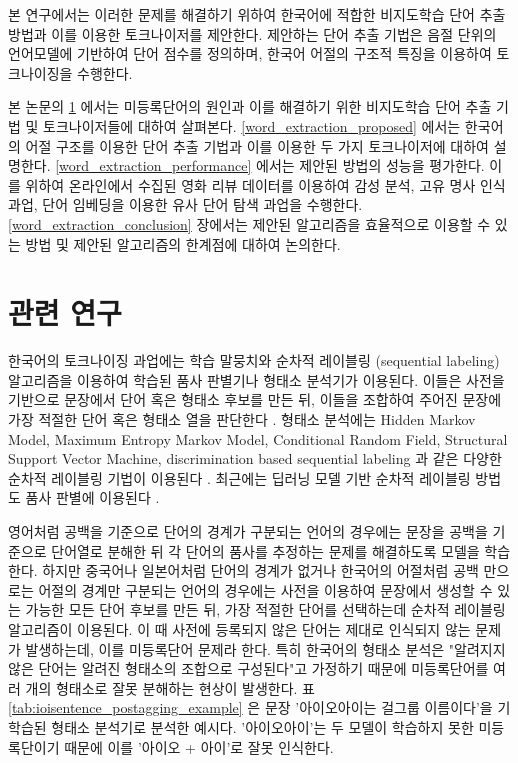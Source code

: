 \documentclass[oneside, ko,phd]{snuthesis_utf8_kor}
\begin{document}
본 연구에서는 이러한 문제를 해결하기 위하여 한국어에 적합한 비지도학습 단어 추출 방법과 이를 이용한 토크나이저를 제안한다.
제안하는 단어 추출 기법은 음절 단위의 언어모델에 기반하여 단어 점수를 정의하며, 한국어 어절의 구조적 특징을 이용하여 토크나이징을 수행한다.

본 논문의 \ref{word_extraction_related} 에서는 미등록단어의 원인과 이를 해결하기 위한 비지도학습 단어 추출 기법 및 토크나이저들에 대하여 살펴본다.
\ref{word_extraction_proposed} 에서는 한국어의 어절 구조를 이용한 단어 추출 기법과 이를 이용한 두 가지 토크나이저에 대하여 설명한다.
\ref{word_extraction_performance} 에서는 제안된 방법의 성능을 평가한다.
이를 위하여 온라인에서 수집된 영화 리뷰 데이터를 이용하여 감성 분석, 고유 명사 인식 과업, 단어 임베딩을 이용한 유사 단어 탐색 과업을 수행한다.
\ref{word_extraction_conclusion} 장에서는 제안된 알고리즘을 효율적으로 이용할 수 있는 방법 및 제안된 알고리즘의 한계점에 대하여 논의한다.

\section{관련 연구} \label{word_extraction_related}

한국어의 토크나이징 과업에는 학습 말뭉치와 순차적 레이블링 (sequential labeling) 알고리즘을 이용하여 학습된 품사 판별기나 형태소 분석기가 이용된다. \cite{konlpy,shim2007made}
이들은 사전을 기반으로 문장에서 단어 혹은 형태소 후보를 만든 뒤, 이들을 조합하여 주어진 문장에 가장 적절한 단어 혹은 형태소 열을 판단한다 \cite{brants2000tnt}.
형태소 분석에는 Hidden Markov Model, Maximum Entropy Markov Model, Conditional Random Field, Structural Support Vector Machine, discrimination based sequential labeling 과 같은 다양한 순차적 레이블링 기법이 이용된다 \cite{krogh1994hidden, mccallum2000maximum, kudo2004applying, taskar2004max, tsochantaridis2005large, bohnet2012transition, na2012crfs}.
최근에는 딥러닝 모델 기반 순차적 레이블링 방법도 품사 판별에 이용된다 \cite{zheng2013deep, collobert2011natural}.

영어처럼 공백을 기준으로 단어의 경계가 구분되는 언어의 경우에는 문장을 공백을 기준으로 단어열로 분해한 뒤 각 단어의 품사를 추정하는 문제를 해결하도록 모델을 학습한다.
하지만 중국어나 일본어처럼 단어의 경계가 없거나 한국어의 어절처럼 공백 만으로는 어절의 경계만 구분되는 언어의 경우에는 사전을 이용하여 문장에서 생성할 수 있는 가능한 모든 단어 후보를 만든 뒤, 가장 적절한 단어를 선택하는데 순차적 레이블링 알고리즘이 이용된다.
이 때 사전에 등록되지 않은 단어는 제대로 인식되지 않는 문제가 발생하는데, 이를 미등록단어 문제라 한다.
특히 한국어의 형태소 분석은 "알려지지 않은 단어는 알려진 형태소의 조합으로 구성된다"고 가정하기 때문에 미등록단어를 여러 개의 형태소로 잘못 분해하는 현상이 발생한다.
표 \ref{tab:ioisentence_postagging_example} 은 문장 '아이오아이는 걸그룹 이름이다'을 기학습된 형태소 분석기로 분석한 예시다.
'아이오아이'는 두 모델이 학습하지 못한 미등록단이기 때문에 이를 '아이오 + 아이'로 잘못 인식한다.
\end{document}

